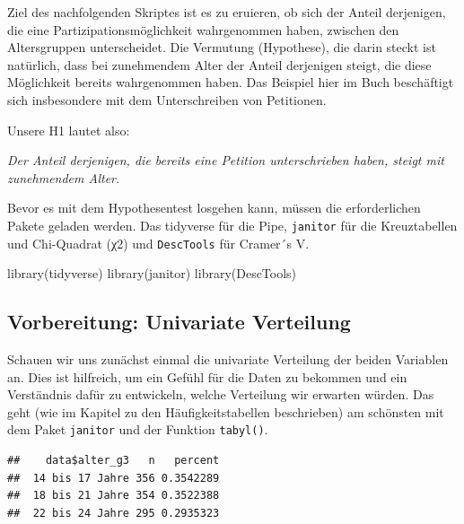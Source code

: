 \documentclass[
]{book}
\newenvironment{Shaded}{\begin{snugshade}}{\end{snugshade}}
\newcommand{\CommentTok}[1]{\textcolor[rgb]{0.56,0.35,0.01}{\textit{#1}}}
\newcommand{\FunctionTok}[1]{\textcolor[rgb]{0.00,0.00,0.00}{#1}}
\newcommand{\NormalTok}[1]{#1}
\newcommand{\SpecialCharTok}[1]{\textcolor[rgb]{0.00,0.00,0.00}{#1}}
\begin{document}
Ziel des nachfolgenden Skriptes ist es zu eruieren, ob sich der Anteil derjenigen, die eine Partizipationsmöglichkeit wahrgenommen haben, zwischen den Altersgruppen unterscheidet. Die Vermutung (Hypothese), die darin steckt ist natürlich, dass bei zunehmendem Alter der Anteil derjenigen steigt, die diese Möglichkeit bereits wahrgenommen haben. Das Beispiel hier im Buch beschäftigt sich insbesondere mit dem Unterschreiben von Petitionen.

Unsere H1 lautet also:

\emph{Der Anteil derjenigen, die bereits eine Petition unterschrieben haben, steigt mit zunehmendem Alter.}

Bevor es mit dem Hypothesentest losgehen kann, müssen die erforderlichen Pakete geladen werden. Das tidyverse für die Pipe, \texttt{janitor} für die Kreuztabellen und Chi-Quadrat (χ2) und \texttt{DescTools} für Cramer´s V.

\begin{Shaded}
\begin{Highlighting}[]
\FunctionTok{library}\NormalTok{(tidyverse)}
\FunctionTok{library}\NormalTok{(janitor)}
\FunctionTok{library}\NormalTok{(DescTools)}
\end{Highlighting}
\end{Shaded}

\hypertarget{vorbereitung-univariate-verteilung}{%
\subsection{Vorbereitung: Univariate Verteilung}\label{vorbereitung-univariate-verteilung}}

Schauen wir uns zunächst einmal die univariate Verteilung der beiden Variablen an.
Dies ist hilfreich, um ein Gefühl für die Daten zu bekommen und ein Verständnis dafür zu entwickeln, welche Verteilung wir erwarten würden.
Das geht (wie im Kapitel zu den Häufigkeitstabellen beschrieben) am schönsten mit dem Paket \texttt{janitor} und der Funktion \texttt{tabyl()}.

\begin{Shaded}
\end{Shaded}

\begin{verbatim}
##    data$alter_g3   n   percent
##  14 bis 17 Jahre 356 0.3542289
##  18 bis 21 Jahre 354 0.3522388
##  22 bis 24 Jahre 295 0.2935323
\end{verbatim}
\end{document}
